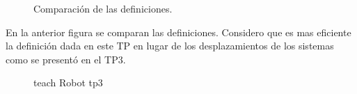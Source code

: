 \documentclass[a4paper,12pt]{article}
\begin{document}
\begin{figure}[H]
    \centering
    \begin{adjustbox}{max width=\columnwidth}
    \end{adjustbox}
    \caption{Comparación de las definiciones.}
    \label{comparacion}
\end{figure}
En la anterior figura se comparan las definiciones. Considero que es mas eficiente la definición
dada en este TP en lugar de los desplazamientos de los sistemas como se presentó en el TP3.


\begin{figure}[H]
    \centering
    \begin{adjustbox}{scale = 0.85, max width=\columnwidth}
    \end{adjustbox}
    \caption{teach Robot tp3}
\end{figure}
\end{document}
